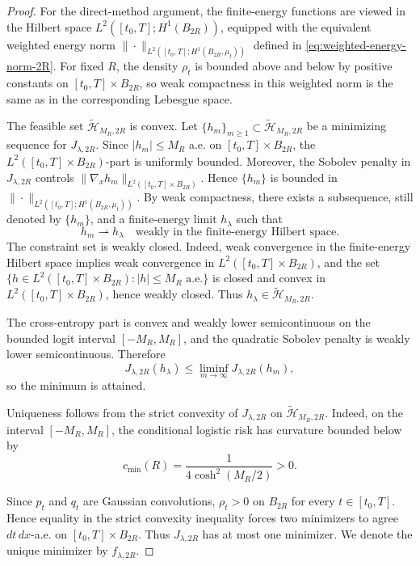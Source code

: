 \documentclass[11pt]{article}
\theoremstyle{plain}
\theoremstyle{definition}
\theoremstyle{remark}
\begin{document}
\begin{proof}

For the direct-method argument, the finite-energy functions are viewed in
the Hilbert space \(L^2([t_0,T];H^1(B_{2R}))\), equipped with the equivalent
weighted energy norm
\(\|\cdot\|_{L^2([t_0,T];H^1(B_{2R},\mu_t))}\) defined in
\eqref{eq:weighted-energy-norm-2R}. For fixed
\(R\), the density \(\rho_t\) is bounded above and below by positive constants
on \([t_0,T]\times B_{2R}\), so weak compactness in this weighted norm is the same as in the
corresponding Lebesgue space.


The feasible set \(\widetilde{\mathcal H}_{M_R,2R}\) is convex. Let \(\{h_m\}_{m\ge1}\subset\widetilde{\mathcal H}_{M_R,2R}\) be a minimizing
sequence for \(J_{\lambda,2R}\). Since \(|h_m|\le M_R\) a.e. on \([t_0,T]\times B_{2R}\),
the \(L^2([t_0,T]\times B_{2R})\)-part is uniformly bounded. Moreover, the Sobolev
penalty in \(J_{\lambda,2R}\) controls
\(\|\nabla_x h_m\|_{L^2([t_0,T]\times B_{2R})}\). Hence \(\{h_m\}\) is bounded in
\(\|\cdot\|_{L^2([t_0,T];H^1(B_{2R},\mu_t))}\). By weak compactness, there exists a subsequence,
still denoted by \(\{h_m\}\), and a finite-energy limit \(h_\lambda\)
such that
\[
h_m\rightharpoonup h_\lambda
\quad\text{weakly in the finite-energy Hilbert space.}
\]
The constraint set is weakly closed. Indeed, weak convergence in the
finite-energy Hilbert space implies weak convergence in \(L^2([t_0,T]\times B_{2R})\), and
the set \(\{h\in L^2([t_0,T]\times B_{2R}): |h|\le M_R\text{ a.e.}\}\) is closed and convex
in \(L^2([t_0,T]\times B_{2R})\), hence weakly closed. Thus
\(h_\lambda\in\widetilde{\mathcal H}_{M_R,2R}\).

The cross-entropy part is convex and weakly lower semicontinuous on the
bounded logit interval \([-M_R,M_R]\), and the quadratic Sobolev penalty is
weakly lower semicontinuous. Therefore
\[
J_{\lambda,2R}(h_\lambda)
\le
\liminf_{m\to\infty}J_{\lambda,2R}(h_m),
\]
so the minimum is attained.

Uniqueness follows from the strict convexity of \(J_{\lambda,2R}\) on
\(\widetilde{\mathcal H}_{M_R,2R}\). Indeed, on the interval \([-M_R,M_R]\), the
conditional logistic risk has curvature bounded below by
\[
c_{\min}(R)
=
\frac{1}{4\cosh^2(M_R/2)}
>0.
\]


Since \(p_t\) and \(q_t\) are Gaussian convolutions, \(\rho_t>0\) on
\(B_{2R}\) for every \(t\in[t_0,T]\). Hence equality in the strict convexity
inequality forces two minimizers to agree \(dt\,dx\)-a.e. on \([t_0,T]\times B_{2R}\). Thus \(J_{\lambda,2R}\) has at most one minimizer. We denote the unique minimizer by \(f_{\lambda,2R}\).



\end{proof}
\end{document}
